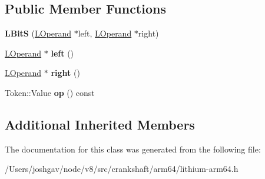 \subsection*{Public Member Functions}
\begin{DoxyCompactItemize}
\item 
{\bfseries L\+BitS} (\hyperlink{classv8_1_1internal_1_1_l_operand}{L\+Operand} $\ast$left, \hyperlink{classv8_1_1internal_1_1_l_operand}{L\+Operand} $\ast$right)\hypertarget{classv8_1_1internal_1_1_l_bit_s_afb5fa167b8c7a1f83a0c98823f928588}{}\label{classv8_1_1internal_1_1_l_bit_s_afb5fa167b8c7a1f83a0c98823f928588}

\item 
\hyperlink{classv8_1_1internal_1_1_l_operand}{L\+Operand} $\ast$ {\bfseries left} ()\hypertarget{classv8_1_1internal_1_1_l_bit_s_a595ee6511ac4b68327342f4f979c3a94}{}\label{classv8_1_1internal_1_1_l_bit_s_a595ee6511ac4b68327342f4f979c3a94}

\item 
\hyperlink{classv8_1_1internal_1_1_l_operand}{L\+Operand} $\ast$ {\bfseries right} ()\hypertarget{classv8_1_1internal_1_1_l_bit_s_aa98554d3fab42e875b850cb411e9afb9}{}\label{classv8_1_1internal_1_1_l_bit_s_aa98554d3fab42e875b850cb411e9afb9}

\item 
Token\+::\+Value {\bfseries op} () const \hypertarget{classv8_1_1internal_1_1_l_bit_s_a716ea26e2831534aa0760dcf42e4da10}{}\label{classv8_1_1internal_1_1_l_bit_s_a716ea26e2831534aa0760dcf42e4da10}

\end{DoxyCompactItemize}
\subsection*{Additional Inherited Members}


The documentation for this class was generated from the following file\+:\begin{DoxyCompactItemize}
\item 
/\+Users/joshgav/node/v8/src/crankshaft/arm64/lithium-\/arm64.\+h\end{DoxyCompactItemize}
